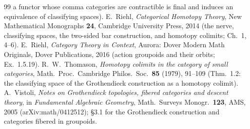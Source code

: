 \documentclass[11pt]{article}
\theoremstyle{plain}
\theoremstyle{definition}
\theoremstyle{remark}
\begin{document}
\begin{thebibliography}{99}
a functor whose comma categories are contractible is final and induces an equivalence of
classifying spaces).
 E.~Riehl, \emph{Categorical Homotopy Theory}, New Mathematical Monographs \textbf{24},
Cambridge University Press, 2014 (the nerve, classifying spaces, the two-sided bar construction, and
homotopy colimits; Ch.~1, 4--6).
 E.~Riehl, \emph{Category Theory in Context}, Aurora: Dover Modern Math
Originals, Dover Publications, 2016 (action groupoids and their orbits; Ex.~1.5.19).
 R.~W.~Thomason, \emph{Homotopy colimits in the category of small
categories}, Math.\ Proc.\ Cambridge Philos.\ Soc.\ \textbf{85} (1979), 91--109 (Thm.~1.2:
the classifying space of the Grothendieck construction as a homotopy colimit).
 A.~Vistoli, \emph{Notes on Grothendieck topologies, fibered categories and descent
theory}, in \emph{Fundamental Algebraic Geometry}, Math.\ Surveys Monogr.\ \textbf{123}, AMS, 2005
(arXiv:math/0412512); \S3.1 for the Grothendieck construction and categories fibered in groupoids.
\end{thebibliography}
\end{document}
